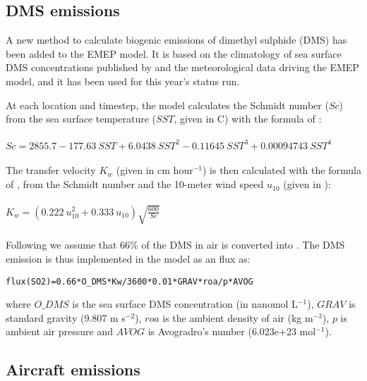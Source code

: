 
\subsection{DMS emissions}
\label{ssec:DMS}


A new method to calculate biogenic emissions of dimethyl sulphide (DMS) has been added to the EMEP model. It is based on the climatology of sea surface DMS concentrations published by \citet{Lana2011} and the meteorological data driving the EMEP model, and it has been used for this year's status run. 

At each location and timestep, the model calculates the Schmidt number ($Sc$) from the sea surface temperature ($SST$, given in \textdegree C) with the formula of \citet{Wanninkhof2014}:
\\
\\
$Sc=2855.7 -177.63\  SST + 6.0438\  SST^2 - 0.11645\  SST^3 + 0.00094743\ SST^4$ 
\\
\\
The transfer velocity $K_{w}$ (given in cm hour$^{-1}$) is then calculated with the formula of \citet{Nightingale2000}, from the Schmidt number and the 10-meter wind speed $u_{10}$ (given in \ms):
\\
\\
$K_w=(0.222\  u_{10}^2 +0.333\ u_{10}) \sqrt{\frac{600}{Sc}} $
\\
\\
Following \citet{Leonor:DMS2} we assume that 66\% of the DMS in air is converted into . The DMS emission is thus implemented in the model as an  flux as:

\begin{verbatim}
flux(SO2)=0.66*O_DMS*Kw/3600*0.01*GRAV*roa/p*AVOG  
\end{verbatim}

where $O\_DMS$ is the sea surface DMS concentration (in nanomol L$^{-1}$),
$GRAV$ is standard gravity (9.807 m s$^{-2}$),
$roa$ is the ambient density of air (kg m$^{-3}$),
$p$ is ambient air pressure
and $AVOG$ is Avogradro's number (6.023e+23 mol$^{-1}$).

\subsection{Aircraft emissions}
\label{ssec:Aircraft}


